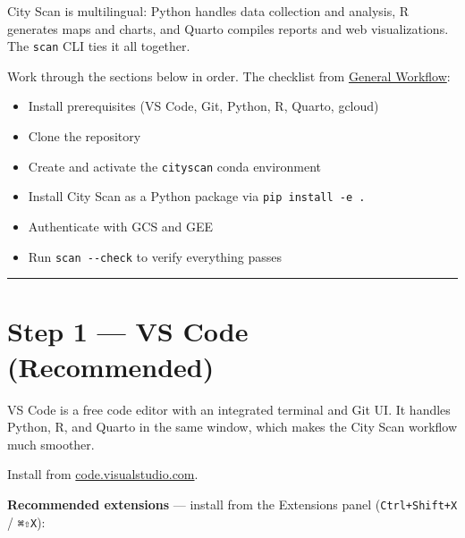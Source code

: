 \documentclass[
  letterpaper,
  DIV=11,
  numbers=noendperiod]{scrreprt}
\providecommand{\tightlist}{%
  \setlength{\itemsep}{0pt}\setlength{\parskip}{0pt}}
\begin{document}
City Scan is multilingual: Python handles data collection and analysis,
R generates maps and charts, and Quarto compiles reports and web
visualizations. The \texttt{scan} CLI ties it all together.

Work through the sections below in order. The checklist from
\hyperref[general-workflow]{General Workflow}:

\begin{itemize}
\tightlist
\item[$\square$]
  Install prerequisites (VS Code, Git, Python, R, Quarto, gcloud)
\item[$\square$]
  Clone the repository
\item[$\square$]
  Create and activate the \texttt{cityscan} conda environment
\item[$\square$]
  Install City Scan as a Python package via \texttt{pip\ install\ -e\ .}
\item[$\square$]
  Authenticate with GCS and GEE
\item[$\square$]
  Run \texttt{scan\ -\/-check} to verify everything passes
\end{itemize}

\begin{center}\rule{0.5\linewidth}{0.5pt}\end{center}

\section{Step 1 --- VS Code
(Recommended)}\label{step-1-vs-code-recommended}

VS Code is a free code editor with an integrated terminal and Git UI. It
handles Python, R, and Quarto in the same window, which makes the City
Scan workflow much smoother.

Install from
\href{https://code.visualstudio.com/Download}{code.visualstudio.com}.

\textbf{Recommended extensions} --- install from the Extensions panel
(\texttt{Ctrl+Shift+X} / \texttt{⌘⇧X}):
\end{document}
